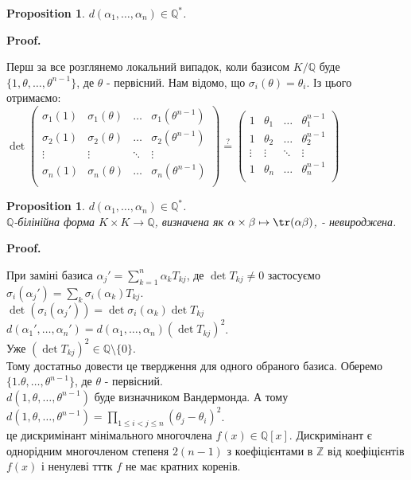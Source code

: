 \documentclass[a4paper, 14pt]{extarticle}
\makeatletter
\theoremstyle{theoremdd}
\theoremstyle{theoremdd}
\theoremstyle{theoremdd}
\theoremstyle{theoremdd}
\theoremstyle{theoremdd}
\newtheorem{proposition}[theorem]{Proposition}
\theoremstyle{theoremdd}
\theoremstyle{theoremdd}
\theoremstyle{theoremdd}
\def\qed{$\blacksquare$}
\renewenvironment{proof}[1][Proof.\\]{\par
\pushQED{\hfill \qed}%
\normalfont \topsep6\p@\@plus6\p@\relax
\trivlist
\item\relax
{\bfseries
#1\@addpunct{.}}\hspace\labelsep\ignorespaces
}{%
\popQED\endtrivlist\@endpefalse
}
\makeatother
\begin{document}
\begin{proposition}
$d(\alpha_1,\dots,\alpha_n) \in \mathbb{Q}^*$.
\end{proposition}

\begin{proof}
Перш за все розглянемо локальний випадок, коли базисом $K/\mathbb{Q}$ буде $\{1,\theta,\dots,\theta^{n-1}\}$, де $\theta$ - первісний. Нам відомо, що $\sigma_i(\theta) = \theta_i$. Із цього отримаємо:\\
$\det \begin{pmatrix}
\sigma_1(1) & \sigma_1(\theta) & \dots & \sigma_1(\theta^{n-1}) \\
\sigma_2(1) & \sigma_2(\theta) & \dots & \sigma_2(\theta^{n-1}) \\
\vdots & \vdots & \ddots & \vdots \\
\sigma_n(1) & \sigma_n(\theta) & \dots & \sigma_n(\theta^{n-1}) \\
\end{pmatrix} \overset{?}{=} \begin{pmatrix}
1 & \theta_1 & \dots & \theta_1^{n-1} \\
1 & \theta_2 & \dots & \theta_2^{n-1} \\
\vdots & \vdots & \ddots & \vdots \\
1 & \theta_n & \dots & \theta_n^{n-1} \\
\end{pmatrix}$
\end{proof}

\begin{proposition}
$d(\alpha_1,\dots,\alpha_n) \in \mathbb{Q}^*$.\\
$\mathbb{Q}$-білінійна форма $K \times K \to \mathbb{Q}$, визначена як $\alpha \times \beta \mapsto \tr(\alpha \beta)$, - невироджена.
\end{proposition}

\begin{proof}
При заміні базиса $\alpha_j' = \displaystyle\sum_{k=1}^n \alpha_k T_{kj}$, де $\det T_{kj} \neq 0$ застосуємо $\sigma_i(\alpha_j') = \displaystyle\sum_{k} \sigma_i(\alpha_k) T_{kj}$.\\
$\det (\sigma_i (\alpha_j')) = \det \sigma_i(\alpha_k) \det T_{kj}$\\
$d(\alpha_1',\dots,\alpha_n') = d(\alpha_1,\dots,\alpha_n) (\det T_{kj})^2$.\\
Уже $(\det T_{kj})^2 \in \mathbb{Q} \setminus \{0\}$.\\
Тому достатньо довести це твердження для одного обраного базиса. Оберемо $\{1.\theta,\dots,\theta^{n-1}\}$, де $\theta$ - первісний.\\
$d(1,\theta,\dots,\theta^{n-1})$ буде визначником Вандермонда. А тому\\
$d(1,\theta,\dots,\theta^{n-1}) = \displaystyle\prod_{1 \leq i < j \leq n} (\theta_j - \theta_i)^2$.\\
це дискримінант мінімального многочлена $f(x) \in \mathbb{Q}[x]$. Дискримінант є однорідним многочленом степеня $2(n-1)$ з коефіцієнтами в $\mathbb{Z}$ від коефіцієнтів $f(x)$ і ненулеві тттк $f$ не має кратних коренів.
\end{proof}
\end{document}
